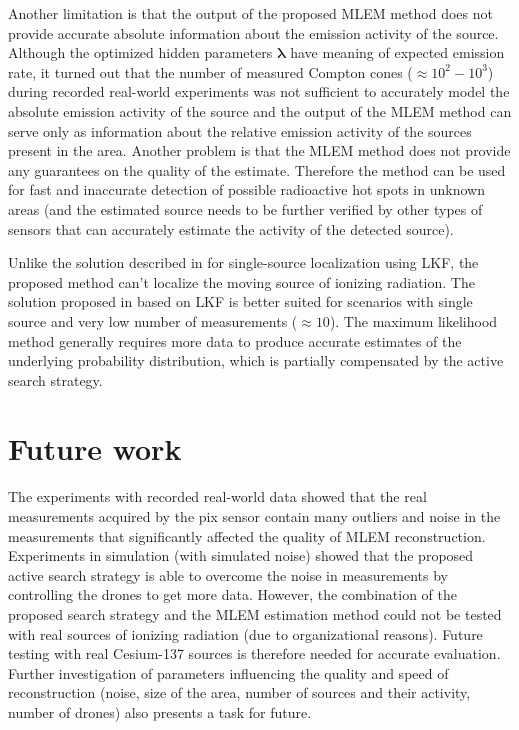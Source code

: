 Another limitation is that the output of the proposed \ac{MLEM} method does not provide accurate absolute information about the emission activity of the source.
Although the optimized hidden parameters $\bm{\lambda}$ have meaning of expected emission rate, 
it turned out that the number of measured Compton cones ($\approx 10^{2}-10^{3}$) during recorded real-world experiments was not sufficient to accurately model the absolute emission activity of the source
and the output of the \ac{MLEM} method can serve only as information about the relative emission activity of the sources present in the area.
Another problem is that the \ac{MLEM} method does not provide any guarantees on the quality of the estimate.
Therefore the method can be used for fast and inaccurate detection of possible radioactive hot spots in unknown areas (and the estimated source needs to be further verified by other types of sensors that can accurately estimate the activity of the detected source).

Unlike the solution described in \cite{baca2021gamma} for single-source localization using \ac{LKF}, the proposed method can't localize the moving source of ionizing radiation.
The solution proposed in \cite{baca2021gamma} based on \ac{LKF} is better suited for scenarios with single source and very low number of measurements ($\approx 10$).
The maximum likelihood method generally requires more data to produce accurate estimates of the underlying probability distribution, which is partially compensated by the active search strategy.

\section{Future work}
The experiments with recorded real-world data showed that the real measurements acquired by the \ac{pix} sensor contain many outliers and noise in the measurements that significantly affected the quality of \ac{MLEM} reconstruction.
Experiments in simulation (with simulated noise) showed that the proposed active search strategy is able to overcome the noise in measurements by controlling the drones to get more data.
However, the combination of the proposed search strategy and the \ac{MLEM} estimation method could not be tested with real sources of ionizing radiation (due to organizational reasons).
Future testing with real Cesium-137 sources is therefore needed for accurate evaluation.
Further investigation of parameters influencing the quality and speed of reconstruction (noise, size of the area, number of sources and their activity, number of drones) also presents a task for future.


